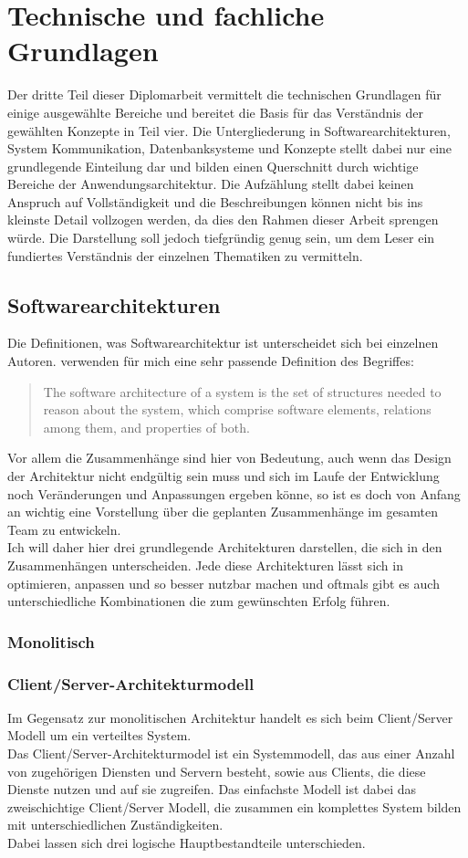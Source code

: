 \chapter{Technische und fachliche Grundlagen} 
\label{ch:grundlagen}
Der dritte Teil dieser Diplomarbeit vermittelt die technischen Grundlagen für einige ausgewählte Bereiche und bereitet die Basis für das Verständnis der gewählten Konzepte in Teil vier. Die Untergliederung in Softwarearchitekturen, System Kommunikation, Datenbanksysteme und Konzepte stellt dabei nur eine grundlegende Einteilung dar und bilden einen Querschnitt durch wichtige Bereiche der Anwendungsarchitektur. Die Aufzählung stellt dabei keinen Anspruch auf Vollständigkeit und die Beschreibungen können nicht bis ins kleinste Detail vollzogen werden, da dies den Rahmen dieser Arbeit sprengen würde. Die Darstellung soll jedoch tiefgründig genug sein, um dem Leser ein fundiertes Verständnis der einzelnen Thematiken zu vermitteln.

\section{Softwarearchitekturen}
Die Definitionen, was Softwarearchitektur ist unterscheidet sich bei einzelnen Autoren. \citet*[S. 4]{Bass.2013} verwenden für mich eine sehr passende Definition des Begriffes:
	\begin{quote} 
	The software architecture of a system is the set of structures needed to reason about the system, which comprise software elements, relations among them, and properties of both.
	 \end{quote}
Vor allem die Zusammenhänge sind hier von Bedeutung, auch wenn das Design der Architektur nicht endgültig sein muss und sich im Laufe der Entwicklung noch Veränderungen und Anpassungen ergeben könne, so ist es doch von Anfang an wichtig eine Vorstellung über die geplanten Zusammenhänge im gesamten Team zu entwickeln.\\
Ich will daher hier drei grundlegende Architekturen darstellen, die sich in den Zusammenhängen unterscheiden. Jede diese Architekturen lässt sich in optimieren, anpassen und so besser nutzbar machen und oftmals gibt es auch unterschiedliche Kombinationen die zum gewünschten Erfolg führen.
	\subsection{Monolitisch}
	\subsection{Client/Server-Architekturmodell}
	Im Gegensatz zur monolitischen Architektur handelt es sich beim Client/Server Modell um ein verteiltes System.\\
	Das Client/Server-Architekturmodel ist ein Systemmodell, das aus einer Anzahl von zugehörigen Diensten und Servern besteht, sowie aus Clients, die diese Dienste nutzen und auf sie zugreifen. Das einfachste Modell ist dabei das zweischichtige Client/Server Modell, die zusammen ein komplettes System bilden mit unterschiedlichen Zuständigkeiten. \\
	Dabei lassen sich drei logische Hauptbestandteile unterschieden.
	
